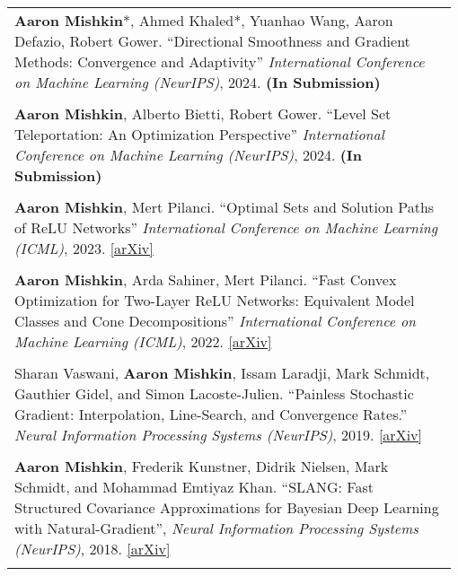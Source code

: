 \documentclass[10pt]{article}
\begin{document}
\begin{longtable}{L{0.98\linewidth}}
    \textbf{Aaron Mishkin}*, Ahmed Khaled*, Yuanhao Wang, Aaron Defazio, Robert Gower. ``Directional Smoothness and Gradient Methods: Convergence and Adaptivity'' \textit{International Conference on Machine Learning (NeurIPS)}, 2024. \textbf{(In Submission)}                                                              \\  \\
    \textbf{Aaron Mishkin}, Alberto Bietti, Robert Gower. ``Level Set Teleportation: An Optimization Perspective'' \textit{International Conference on Machine Learning (NeurIPS)}, 2024. \textbf{(In Submission)}                                                                                                              \\  \\
    \textbf{Aaron Mishkin}, Mert Pilanci. ``Optimal Sets and Solution Paths of ReLU Networks'' \textit{International Conference on Machine Learning (ICML)}, 2023. \href{https://arxiv.org/abs/2306.00119}{[arXiv]}                                                                                                             \\  \\
    \textbf{Aaron Mishkin}, Arda Sahiner, Mert Pilanci. ``Fast Convex Optimization for Two-Layer ReLU Networks: Equivalent Model Classes and Cone Decompositions'' \textit{International Conference on Machine Learning (ICML)}, 2022. \href{https://arxiv.org/abs/2202.01331}{[arXiv]}                                         \\  \\
    Sharan Vaswani, \textbf{Aaron Mishkin}, Issam Laradji, Mark Schmidt, Gauthier
    Gidel, and Simon Lacoste-Julien.
    ``Painless Stochastic Gradient: Interpolation, Line-Search, and Convergence Rates.'' \textit{Neural Information Processing Systems (NeurIPS)}, 2019. \href{https://arxiv.org/abs/1905.09997}{[arXiv]}                                                                                                                       \\  \\
    \textbf{Aaron Mishkin}, Frederik Kunstner, Didrik Nielsen, Mark Schmidt, and Mohammad Emtiyaz Khan. ``SLANG: Fast Structured Covariance Approximations for Bayesian Deep Learning with Natural-Gradient'', \textit{Neural Information Processing Systems (NeurIPS)}, 2018. \href{https://arxiv.org/abs/1811.04504}{[arXiv]} \\  \\
\end{longtable}
\end{document}
